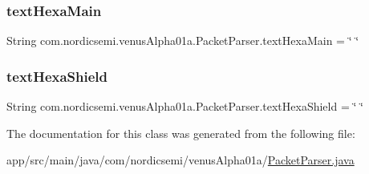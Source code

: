\subsubsection{\texorpdfstring{text\+Hexa\+Main}{textHexaMain}}
{\footnotesize\ttfamily String com.\+nordicsemi.\+venus\+Alpha01a.\+Packet\+Parser.\+text\+Hexa\+Main = \char`\"{} \char`\"{}\hspace{0.3cm}{\ttfamily [static]}}

\mbox{\label{classcom_1_1nordicsemi_1_1venus_alpha01a_1_1_packet_parser_a954331deb6f3c9b2c7fb9d584cee544b}} 
\subsubsection{\texorpdfstring{text\+Hexa\+Shield}{textHexaShield}}
{\footnotesize\ttfamily String com.\+nordicsemi.\+venus\+Alpha01a.\+Packet\+Parser.\+text\+Hexa\+Shield = \char`\"{} \char`\"{}\hspace{0.3cm}{\ttfamily [static]}}



The documentation for this class was generated from the following file\+:\begin{DoxyCompactItemize}
\item 
app/src/main/java/com/nordicsemi/venus\+Alpha01a/\hyperlink{_packet_parser_8java}{Packet\+Parser.\+java}\end{DoxyCompactItemize}
